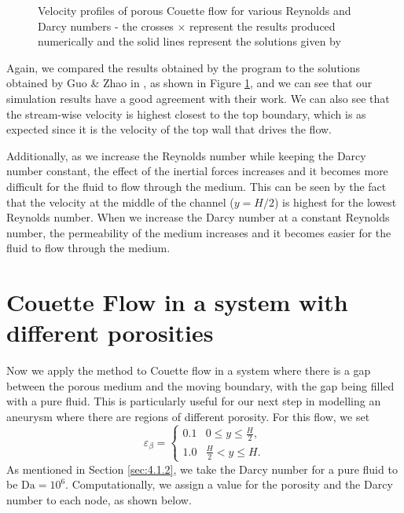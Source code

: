 \documentclass[a4paper, 11pt]{report}
\begin{document}
\begin{figure}[!htb]
\begin{flushleft}
\centering
    
    
\end{flushleft}
\caption[Velocity profiles of porous Couette flow for various Reynolds and Darcy numbers]{Velocity profiles of porous Couette flow for various Reynolds and Darcy numbers - the crosses $\times$ represent the results produced numerically and the solid lines represent the solutions given by \cite{guo+zhao}}
\label{fig:numcouette}
\end{figure}
\newpage 
Again, we compared the results obtained by the program to the solutions obtained by Guo \& Zhao in \cite{guo+zhao}, as shown in Figure \ref{fig:numcouette}, and we can see that our simulation results have a good agreement with their work. We can also see that the stream-wise velocity is highest closest to the top boundary, which is as expected since it is the velocity of the top wall that drives the flow. 

Additionally, as we increase the Reynolds number while keeping the Darcy number constant, the effect of the inertial forces increases and it becomes more difficult for the fluid to flow through the medium. This can be seen by the fact that the velocity at the middle of the channel ($y=H/2$) is highest for the lowest Reynolds number. When we increase the Darcy number at a constant Reynolds number, the permeability of the medium increases and it becomes easier for the fluid to flow through the medium. 

\section{Couette Flow in a system with different porosities}
Now we apply the method to Couette flow in a system where there is a gap between the porous medium and the moving boundary, with the gap being filled with a pure fluid. This is particularly useful for our next step in modelling an aneurysm where there are regions of different porosity. For this flow, we set
\begin{equation}
    \varepsilon_\beta = 
    \begin{cases}
        0.1 & 0 \leq y \leq \frac{H}{2}, \\
        1.0 & \frac{H}{2} < y \leq H.
    \end{cases}
\end{equation}
As mentioned in Section \ref{sec:4.1.2}, we take the Darcy number for a pure fluid to be $\mathrm{Da}=10^6$. Computationally, we assign a value for the porosity and the Darcy number to each node, as shown below. 
\end{document}
